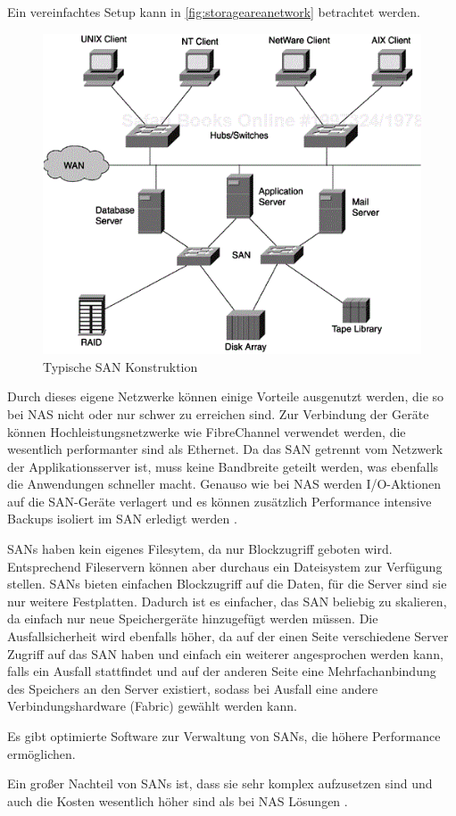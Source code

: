 Ein vereinfachtes Setup kann in \autoref{fig:storageareanetwork} betrachtet werden.

\begin{figure}[hbt]
	\centering
	\includegraphics[scale=0.6]{images/storage-area-network}
	\caption{Typische SAN Konstruktion \parencite{jabramo.2010}}
	\label{fig:storageareanetwork}
\end{figure}

Durch dieses eigene Netzwerke können einige Vorteile ausgenutzt werden, die so bei \ac{NAS} nicht oder nur schwer zu erreichen sind. Zur Verbindung der Geräte können Hochleistungsnetzwerke wie FibreChannel verwendet werden, die wesentlich performanter sind als Ethernet. Da das SAN getrennt vom Netzwerk der Applikationsserver ist, muss keine Bandbreite geteilt werden, was ebenfalls die Anwendungen schneller macht. Genauso wie bei NAS werden I/O-Aktionen auf die SAN-Geräte verlagert und es können zusätzlich Performance intensive Backups isoliert im SAN erledigt werden \parencite[Kap. 1, SANs]{gupta.2002}.

SANs haben kein eigenes Filesytem, da nur Blockzugriff geboten wird. Entsprechend Fileservern können aber durchaus ein Dateisystem zur Verfügung stellen. SANs bieten einfachen Blockzugriff auf die Daten, für die Server sind sie nur weitere Festplatten. Dadurch ist es einfacher, das SAN beliebig zu skalieren, da einfach nur neue Speichergeräte hinzugefügt werden müssen. Die Ausfallsicherheit wird ebenfalls höher, da auf der einen Seite verschiedene Server Zugriff auf das SAN haben und einfach ein weiterer angesprochen werden kann, falls ein Ausfall stattfindet und auf der anderen Seite eine Mehrfachanbindung des Speichers an den Server existiert, sodass bei Ausfall eine andere Verbindungshardware (Fabric) gewählt werden kann. 

Es gibt optimierte Software zur Verwaltung von SANs, die höhere Performance ermöglichen.

Ein großer Nachteil von SANs ist, dass sie sehr komplex aufzusetzen sind und auch die Kosten wesentlich höher sind als bei NAS Lösungen \parencite[Kap. 2]{gupta.2002}.